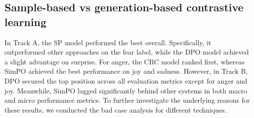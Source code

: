 \documentclass[11pt]{article}
\begin{document}
\subsection{Sample-based vs generation-based contrastive learning}


In Track A, the SP model performed the best overall. Specifically, it outperformed other approaches on the fear label, while the DPO model achieved a slight advantage on surprise. For anger, the CRC model ranked first, whereas SimPO achieved the best performance on joy and sadness. However, in Track B, DPO secured the top position across all evaluation metrics except for anger and joy. Meanwhile, SimPO lagged significantly behind other systems in both macro and micro performance metrics. To further investigate the underlying reasons for these results, we conducted the bad case analysis for different techniques.

\end{document}
